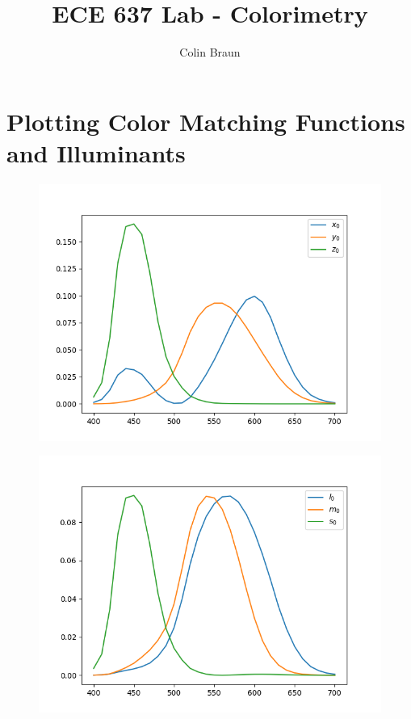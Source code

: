 \documentclass{article}
\title{ECE 637 Lab - Colorimetry}
\author{Colin Braun}
\begin{document}
\maketitle

\section{Plotting Color Matching Functions and Illuminants}
\begin{figure}[H]
    \centering
    \includegraphics[width=1\textwidth]{../2-x0-y0-z0.png}
\end{figure}
\begin{figure}[H]
    \centering
    \includegraphics[width=1\textwidth]{../2-l0-m0-s0.png}
\end{figure}
\end{document}
